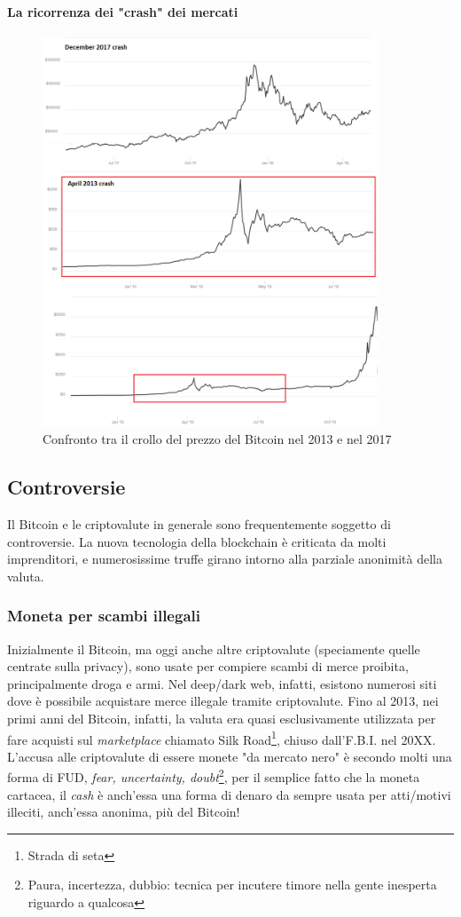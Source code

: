\documentclass {article}
\begin{document}
\paragraph {La ricorrenza dei "crash" dei mercati}

\vspace {0.5cm}
\begin{figure}[htb!]
\includegraphics [width = 10cm] {crash2.png}
\centering
\caption {Confronto tra il crollo del prezzo del Bitcoin nel 2013 e nel 2017}
\end{figure}
\vspace {0.2cm}
\noindent
%

\subsection {Controversie}


Il Bitcoin e le criptovalute in generale sono frequentemente soggetto di controversie. La nuova tecnologia della blockchain è criticata da molti imprenditori, e numerosissime truffe girano intorno alla parziale anonimità della valuta.


\subsubsection {Moneta per scambi illegali}


Inizialmente il Bitcoin, ma oggi anche altre criptovalute (speciamente quelle centrate sulla privacy), sono usate per compiere scambi di merce proibita, principalmente droga e armi.
Nel deep/dark web, infatti, esistono numerosi siti dove è possibile acquistare merce illegale tramite criptovalute.
Fino al 2013, nei primi anni del Bitcoin, infatti, la valuta era quasi esclusivamente utilizzata per fare acquisti sul \textit{marketplace} chiamato Silk Road\footnote{Strada di seta}, chiuso dall'F.B.I. nel 20XX.
L'accusa alle criptovalute di essere monete "da mercato nero" è secondo molti una forma di FUD, \textit{fear, uncertainty, doubt}\footnote{Paura, incertezza, dubbio: tecnica per incutere timore nella gente inesperta riguardo a qualcosa}, per il semplice fatto che la moneta cartacea, il \textit{cash} è anch'essa una forma di denaro da sempre usata per atti/motivi illeciti, anch'essa anonima, più del Bitcoin! 
\end{document}
